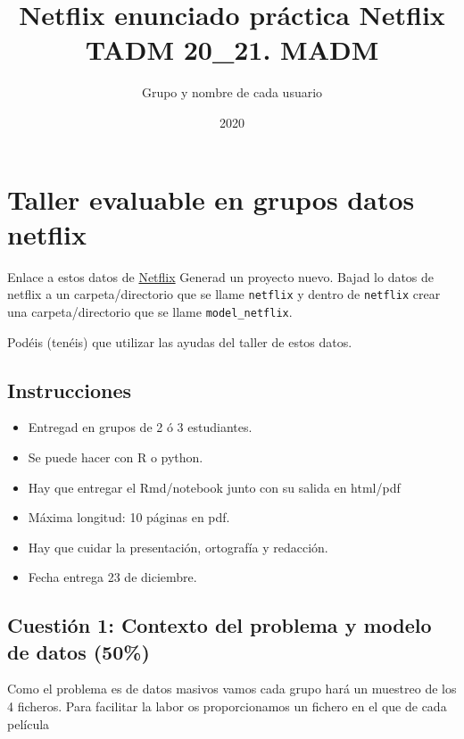 \documentclass[
]{article}
\title{Netflix enunciado práctica Netflix TADM 20\_21. MADM}
\author{Grupo y nombre de cada usuario}
\date{2020}
\providecommand{\tightlist}{%
  \setlength{\itemsep}{0pt}\setlength{\parskip}{0pt}}
\begin{document}
\maketitle

{
\hypersetup{linkcolor=blue}
\setcounter{tocdepth}{2}
\tableofcontents
}
\hypertarget{taller-evaluable-en-grupos-datos-netflix}{%
\section{Taller evaluable en grupos datos
netflix}\label{taller-evaluable-en-grupos-datos-netflix}}

Enlace a estos datos de
\href{https://www.kaggle.com/netflix-inc/netflix-prize-data}{Netflix}
Generad un proyecto nuevo. Bajad lo datos de netflix a un
carpeta/directorio que se llame \texttt{netflix} y dentro de
\texttt{netflix} crear una carpeta/directorio que se llame
\texttt{model\_netflix}.

Podéis (tenéis) que utilizar las ayudas del taller de estos datos.

\hypertarget{instrucciones}{%
\subsection{Instrucciones}\label{instrucciones}}

\begin{itemize}
\tightlist
\item
  Entregad en grupos de 2 ó 3 estudiantes.
\item
  Se puede hacer con R o python.
\item
  Hay que entregar el Rmd/notebook junto con su salida en html/pdf
\item
  Máxima longitud: 10 páginas en pdf.
\item
  Hay que cuidar la presentación, ortografía y redacción.
\item
  Fecha entrega 23 de diciembre.
\end{itemize}

\hypertarget{cuestiuxf3n-1-contexto-del-problema-y-modelo-de-datos-50}{%
\subsection{Cuestión 1: Contexto del problema y modelo de datos
(50\%)}\label{cuestiuxf3n-1-contexto-del-problema-y-modelo-de-datos-50}}

Como el problema es de datos masivos vamos cada grupo hará un muestreo
de los 4 ficheros. Para facilitar la labor os proporcionamos un fichero
en el que de cada película
\end{document}
